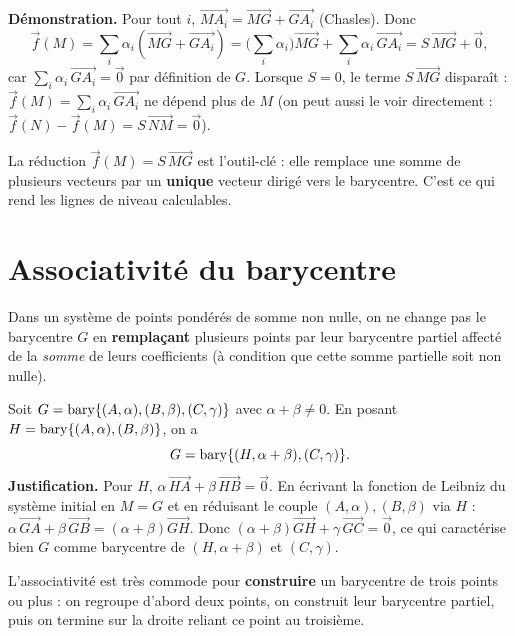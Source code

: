 \begin{remarque}
\textbf{Démonstration.} Pour tout $i$, $\vec{MA_i}=\vec{MG}+\vec{GA_i}$ (Chasles).
Donc
\[ \vec{f}(M)=\sum_i\alpha_i(\vec{MG}+\vec{GA_i})
   =\Big(\sum_i\alpha_i\Big)\vec{MG}+\sum_i\alpha_i\,\vec{GA_i}=S\,\vec{MG}+\vec{0}, \]
car $\sum_i\alpha_i\,\vec{GA_i}=\vec{0}$ par définition de $G$. Lorsque $S=0$, le
terme $S\,\vec{MG}$ disparaît : $\vec{f}(M)=\sum_i\alpha_i\,\vec{GA_i}$ ne dépend plus
de $M$ (on peut aussi le voir directement : $\vec{f}(N)-\vec{f}(M)=S\,\vec{NM}=\vec{0}$).
\end{remarque}

\begin{aretenir}
La réduction $\vec{f}(M)=S\,\vec{MG}$ est l'outil-clé : elle remplace une somme de
plusieurs vecteurs par un \textbf{unique} vecteur dirigé vers le barycentre. C'est ce
qui rend les lignes de niveau calculables.
\end{aretenir}

\section{Associativité du barycentre}

\begin{theoreme}
Dans un système de points pondérés de somme non nulle, on ne change pas le barycentre
$G$ en \textbf{remplaçant} plusieurs points par leur barycentre partiel affecté de la
\emph{somme} de leurs coefficients (à condition que cette somme partielle soit non
nulle).
\end{theoreme}

\begin{exemple}
Soit $G=\operatorname{bary}\{(A,\alpha),(B,\beta),(C,\gamma)\}$ avec $\alpha+\beta\neq0$. En posant
$H=\operatorname{bary}\{(A,\alpha),(B,\beta)\}$, on a
\[ G=\operatorname{bary}\{(H,\alpha+\beta),(C,\gamma)\}. \]
\textbf{Justification.} Pour $H$, $\alpha\,\vec{HA}+\beta\,\vec{HB}=\vec{0}$. En
écrivant la fonction de Leibniz du système initial en $M=G$ et en réduisant le couple
$(A,\alpha),(B,\beta)$ via $H$ : $\alpha\,\vec{GA}+\beta\,\vec{GB}=(\alpha+\beta)\vec{GH}$.
Donc $(\alpha+\beta)\vec{GH}+\gamma\,\vec{GC}=\vec{0}$, ce qui caractérise bien $G$ comme
barycentre de $(H,\alpha+\beta)$ et $(C,\gamma)$.
\end{exemple}

\begin{remarque}
L'associativité est très commode pour \textbf{construire} un barycentre de trois points
ou plus : on regroupe d'abord deux points, on construit leur barycentre partiel, puis on
termine sur la droite reliant ce point au troisième.
\end{remarque}

